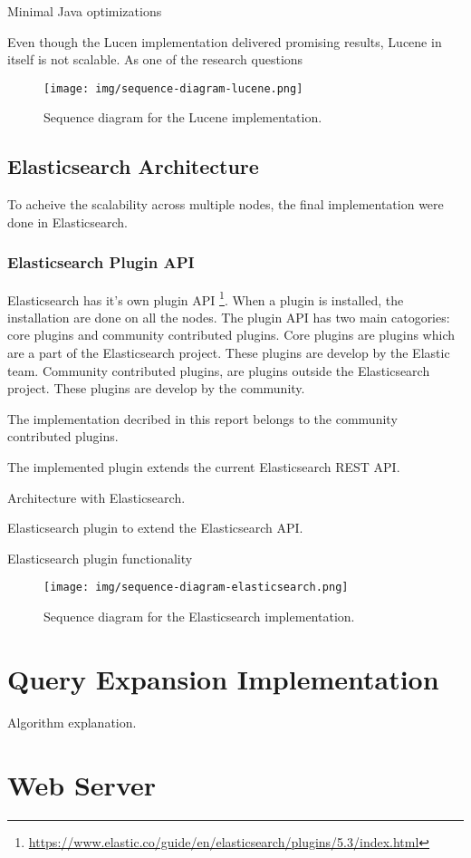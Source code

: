 Minimal Java optimizations

Even though the Lucen implementation delivered promising results, Lucene in itself is not scalable.
As one of the research questions

\begin{figure}[h!]
\centering \texttt{[image: img/sequence-diagram-lucene.png]}
\caption{Sequence diagram for the Lucene implementation.}
\label{fig:sequence-diagram-lucene}
\end{figure}

\subsection{Elasticsearch Architecture}
To acheive the scalability across multiple nodes, the final implementation were done in Elasticsearch.


\subsubsection{Elasticsearch Plugin API}
Elasticsearch has it's own plugin API \footnote{\url{https://www.elastic.co/guide/en/elasticsearch/plugins/5.3/index.html}}.
When a plugin is installed, the installation are done on all the nodes.
The plugin API has two main catogories: core plugins and community contributed plugins.
Core plugins are plugins which are a part of the Elasticsearch project.
These plugins are develop by the Elastic team.
Community contributed plugins, are plugins outside the Elasticsearch project.
These plugins are develop by the community.

The implementation decribed in this report belongs to the community contributed plugins.

The implemented plugin extends the current Elasticsearch REST API.

Architecture with Elasticsearch.

Elasticsearch plugin to extend the Elasticsearch API.

Elasticsearch plugin functionality

\begin{figure}[h!]
\centering \texttt{[image: img/sequence-diagram-elasticsearch.png]}
\caption{Sequence diagram for the Elasticsearch implementation.}
\label{fig:sequence-diagram-lucene}
\end{figure}

\section{Query Expansion Implementation}
Algorithm explanation.

\section{Web Server}
